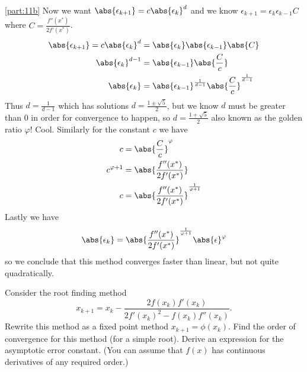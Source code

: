 \documentclass[boxes,pages]{homework}
\begin{document}
\begin{solution}
	\ref{part:11b}
	Now we want $\abs{\epsilon_{k+1}} = c\abs{\epsilon_k}^d$ and we know $\epsilon_{k+1} = \epsilon_k\epsilon_{k-1}C$ where $C = \frac{f''(x^*)}{2f'(x^*)}$.
	\begin{align*}
		\abs{\epsilon_{k+1}} = c\abs{\epsilon_k}^d & = \abs{\epsilon_k}\abs{\epsilon_{k-1}}\abs{C}                           \\
		\abs{\epsilon_k}^{d-1}                     & = \abs{\epsilon_{k-1}}\abs{\frac{C}{c}}                                 \\
		\abs{\epsilon_k}                           & = \abs{\epsilon_{k-1}}^{\frac{1}{d-1}}\abs{\frac{C}{c}}^{\frac{1}{d-1}}
	\end{align*}
	Thus $d = \frac{1}{d - 1}$ which has solutions $d = \frac{1\pm\sqrt{5}}{2}$, but we know $d$ must be greater than 0 in order for convergence to happen, so $d = \frac{1 + \sqrt{5}}{2}$ also known as the golden ratio $\varphi$! Cool. Similarly for the constant $c$ we have
	\begin{align*}
		c               & = \abs{\frac{C}{c}}^{\varphi}                             \\
		c^{\varphi + 1} & = \abs{\frac{f''(x^*)}{2f'(x^*)}}                         \\
		c               & = \abs{\frac{f''(x^*)}{2f'(x^*)}}^{\frac{1}{\varphi + 1}}
	\end{align*}
	Lastly we have
	\begin{equation*}
		\abs{\epsilon_k} = \abs{\frac{f''(x^*)}{2f'(x^*)}}^{\frac{1}{\varphi + 1}}\abs{\epsilon}^\varphi
	\end{equation*}
	so we conclude that this method converges faster than linear, but not quite quadratically.
\end{solution}

\begin{problem}
Consider the root finding method
\[x_{k+1} = x_k - \frac{2f(x_k)f'(x_k)}{2f'(x_k)^2 - f(x_k)f''(x_k)}.\]
Rewrite this method as a fixed point method $x_{k+1} = \phi(x_k)$. Find the order of convergence for this method (for a simple root). Derive an expression for the asymptotic error constant. (You can assume that $f(x)$ has continuous derivatives of any required order.)
\end{problem}
\end{document}
